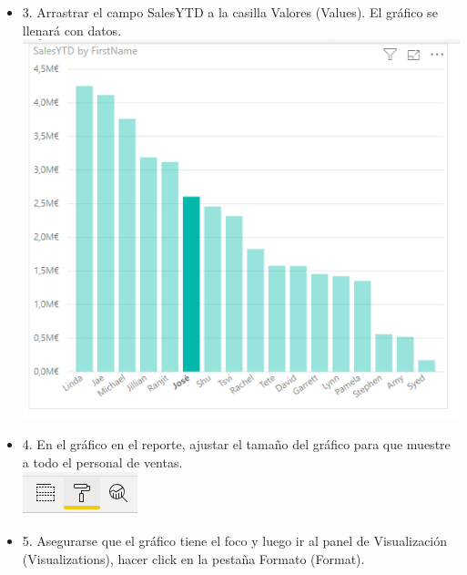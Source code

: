 \begin{itemize}
\item 3. Arrastrar el campo SalesYTD a la casilla Valores (Values). El gráfico se llenará con datos.\\
\includegraphics[scale=0.5]{./Imagenes/image017}
\item 4. En el gráfico en el reporte, ajustar el tamaño del gráfico para que muestre a todo el personal de ventas. \\
\includegraphics[scale=0.8]{./Imagenes/image018}
\item 5. Asegurarse que el gráfico tiene el foco y luego ir al panel de Visualización (Visualizations), hacer click en la pestaña Formato (Format). \\



\end{itemize}
